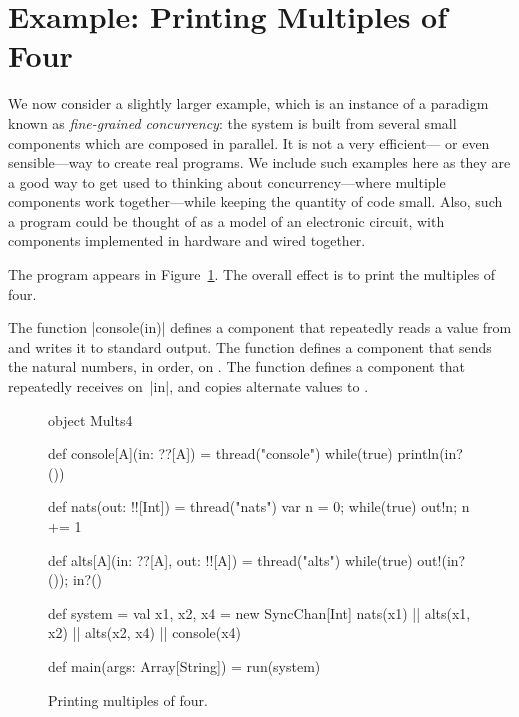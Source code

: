 
\section{Example: Printing Multiples of Four}

We now consider a slightly larger example, which is an instance of a paradigm
known as \emph{fine-grained concurrency}: the system is built from several
small components which are composed in parallel.  It is not a very
efficient--- or even sensible---way to create real programs.  We include such
examples here as they are a good way to get used to thinking about
concurrency---where multiple components work together---while keeping the
quantity of code small.  Also, such a program could be thought of as a model
of an electronic circuit, with components implemented in hardware and wired
together.

The program appears in Figure~\ref{fig:Mults4}. The overall effect is to print
the multiples of four.

The function |console(in)| defines a component that repeatedly reads a value
from  and writes it to standard output.  The function
 defines a component that sends the natural numbers, in
order, on .  The function  defines a component
that repeatedly receives on~|in|, and copies alternate values to .


\begin{figure}
\begin{scala}
object Mults4{
  def console[A](in: ??[A]) = thread("console"){ while(true) println(in?()) }

  def nats(out: !![Int]) = thread("nats"){ 
    var n = 0; while(true){ out!n; n += 1 }
  }

  def alts[A](in: ??[A], out: !![A]) = thread("alts"){ 
    while(true){ out!(in?()); in?() } 
  }

  def system = {
    val x1, x2, x4 = new SyncChan[Int]
    nats(x1) || alts(x1, x2) || alts(x2, x4) || console(x4)
  }

  def main(args: Array[String]) = run(system)
}
\end{scala}
\caption{Printing multiples of four.}
\label{fig:Mults4}
\end{figure}


